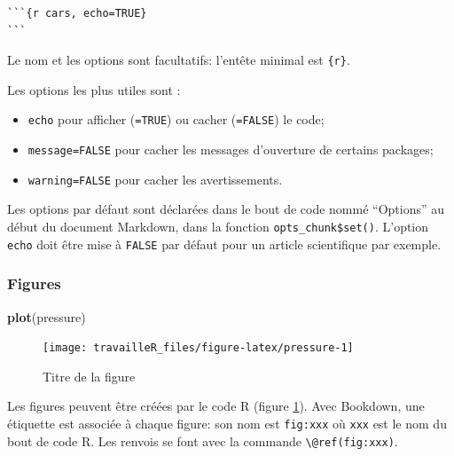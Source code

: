 \documentclass[
  12pt,
  french,
  a4paper,
  extrafontsizes,onecolumn,openright
  ]{memoir}
\newenvironment{Shaded}{\begin{snugshade}}{\end{snugshade}}
\newcommand{\KeywordTok}[1]{\textcolor[rgb]{0.13,0.29,0.53}{\textbf{#1}}}
\newcommand{\NormalTok}[1]{#1}
\providecommand{\tightlist}{%
  \setlength{\itemsep}{0pt}\setlength{\parskip}{0pt}}
\begin{document}
\begin{verbatim}
```{r cars, echo=TRUE}
```
\end{verbatim}

Le nom et les options sont facultatifs: l'entête minimal est \texttt{\{r\}}.

Les options les plus utiles sont :

\begin{itemize}
\tightlist
\item
  \texttt{echo} pour afficher (\texttt{=TRUE}) ou cacher (\texttt{=FALSE}) le code;
\item
  \texttt{message=FALSE} pour cacher les messages d'ouverture de certains packages;
\item
  \texttt{warning=FALSE} pour cacher les avertissements.
\end{itemize}

Les options par défaut sont déclarées dans le bout de code nommé \enquote{Options} au début du document Markdown, dans la fonction \texttt{opts\_chunk\$set()}.
L'option \texttt{echo} doit être mise à \texttt{FALSE} par défaut pour un article scientifique par exemple.

\hypertarget{figures}{%
\subsubsection{Figures}\label{figures}}

\scriptsize

\begin{Shaded}
\begin{Highlighting}[]
\KeywordTok{plot}\NormalTok{(pressure)}
\end{Highlighting}
\end{Shaded}

\begin{figure}

{\centering \texttt{[image: travailleR\_files/figure-latex/pressure-1]} 

}

\caption{Titre de la figure}\label{fig:pressure}
\end{figure}

\normalsize

Les figures peuvent être créées par le code R (figure \ref{fig:pressure}).
Avec Bookdown, une étiquette est associée à chaque figure: son nom est \texttt{fig:xxx} où \texttt{xxx} est le nom du bout de code R.
Les renvois se font avec la commande \texttt{\textbackslash{}@ref(fig:xxx)}.
\end{document}
